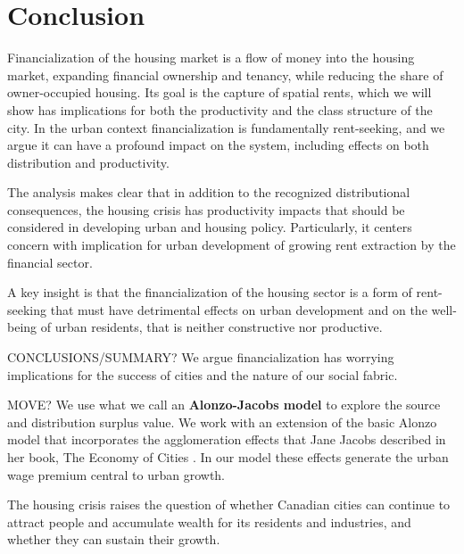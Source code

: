 \chapter{Conclusion} \label{chapter-conclusions}

Financialization of the housing market is a flow of money into the housing market, expanding financial ownership and tenancy, while reducing the share of owner-occupied housing. Its goal is the capture of spatial rents, which we will show has implications for both the productivity and the class structure of the city. 
In the urban context financialization is fundamentally \gls{rent-seeking}, and we argue it can have a profound impact on the system, including effects on both distribution and productivity. 

The analysis makes clear that in addition to the recognized distributional consequences, the housing crisis has productivity impacts that should be considered in developing urban and housing policy. Particularly, it centers concern with implication for urban development of growing rent extraction by the financial sector. 

A key insight is that the financialization of the housing sector is a form of \gls{rent-seeking} that must have detrimental effects on urban development and on the well-being of urban residents, that is neither constructive nor productive.

CONCLUSIONS/SUMMARY?
We argue financialization %
has worrying implications for the success of cities and the nature of our social fabric. 

MOVE? We use what we call an \textbf{\gls{Alonzo-Jacobs model}} to explore the source and distribution surplus value. We  work with an extension of the basic Alonzo model that incorporates the \gls{agglomeration effects} that Jane Jacobs  described in her book, The Economy of Cities \cite{jacobsEconomyCities1969}. In our model these effects generate the \gls{urban wage premium} central to urban growth. %

The housing crisis raises the question of whether Canadian cities can continue to attract people and accumulate wealth for its residents and industries, and whether they can sustain their growth.



